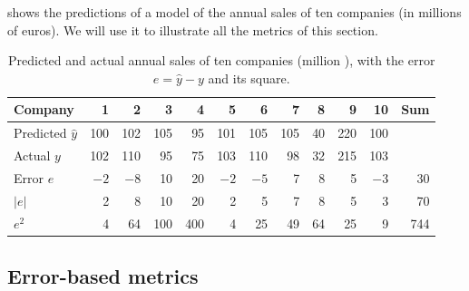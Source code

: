  shows the predictions of a model of the annual sales of ten companies (in
millions of euros). We will use it to illustrate all the metrics of this section.

\begin{table}[htbp]
\centering\small
\caption{Predicted and actual annual sales of ten companies (million \texteuro), with the
error $e=\hat y-y$ and its square.}\label{tab:regex}
\begin{tabular}{@{}lrrrrrrrrrr|r@{}}
\toprule
Company & 1 & 2 & 3 & 4 & 5 & 6 & 7 & 8 & 9 & 10 & Sum\\
\midrule
Predicted $\hat y$ & 100 & 102 & 105 & 95 & 101 & 105 & 105 & 40 & 220 & 100 &\\
Actual $y$         & 102 & 110 & 95  & 75 & 103 & 110 & 98  & 32 & 215 & 103 &\\
Error $e$          & $-2$ & $-8$ & 10 & 20 & $-2$ & $-5$ & 7 & 8 & 5 & $-3$ & 30\\
$|e|$              & 2 & 8 & 10 & 20 & 2 & 5 & 7 & 8 & 5 & 3 & 70\\
$e^2$              & 4 & 64 & 100 & 400 & 4 & 25 & 49 & 64 & 25 & 9 & 744\\
\bottomrule
\end{tabular}
\end{table}

\subsection{Error-based metrics}


